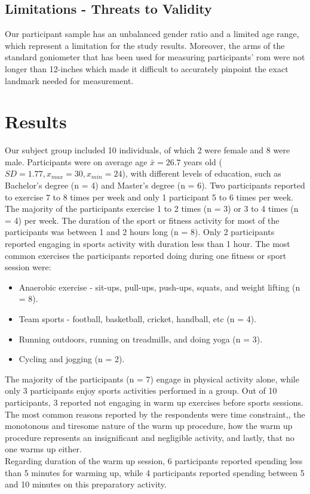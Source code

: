 \subsection{Limitations - Threats to Validity}
Our participant sample has an unbalanced gender ratio and a limited age range, which represent a limitation for the study results. Moreover, the arms of the standard goniometer that has been used for measuring participants' \acrshort{rom} were not longer than 12-inches which made it difficult to accurately pinpoint the exact landmark needed for measurement.
\section{Results}
Our subject group included 10 individuals, of which 2 were female and 8 were male. Participants were on average age \begin{math}\bar{x} = 26.7\end{math} years old (\begin{math}SD= 1.77,  x_{max}=30 ,x_{min}= 24 \end{math}), with different levels of education, such as Bachelor's degree (n = 4) and Master's degree (n = 6). Two participants reported to exercise 7 to 8 times per week and only 1 participant 5 to 6 times per week. The majority of the participants exercise 1 to 2 times (n = 3) or 3 to 4 times (n = 4) per week. The duration of the sport or fitness activity for most of the participants was between 1 and 2 hours long (n = 8). Only 2 participants reported engaging in sports activity with duration less than 1 hour. The most common exercises the participants reported doing during one fitness or sport session were:
\begin{itemize}
\item Anaerobic exercise - sit-ups, pull-ups, push-ups, squats, and weight lifting (n = 8).
\item Team sports - football, basketball, cricket, handball, etc (n = 4).
\item Running outdoors, running on treadmills, and doing yoga (n = 3).
\item Cycling and jogging (n = 2).
\end{itemize}
The majority of the participants (n = 7) engage in physical activity alone, while only 3 participants enjoy sports activities performed in a group. Out of 10 participants, 3 reported not engaging in warm up exercises before sports sessions. The most common reasons reported by the respondents were time constraint,, the monotonous and tiresome nature of the warm up procedure, how the warm up procedure represents an insignificant and negligible activity, and lastly, that no one warms up either.\\ Regarding duration of the warm up session, 6 participants reported spending less than 5 minutes for warming up, while 4 participants reported spending between 5 and 10 minutes on this preparatory activity.\\
